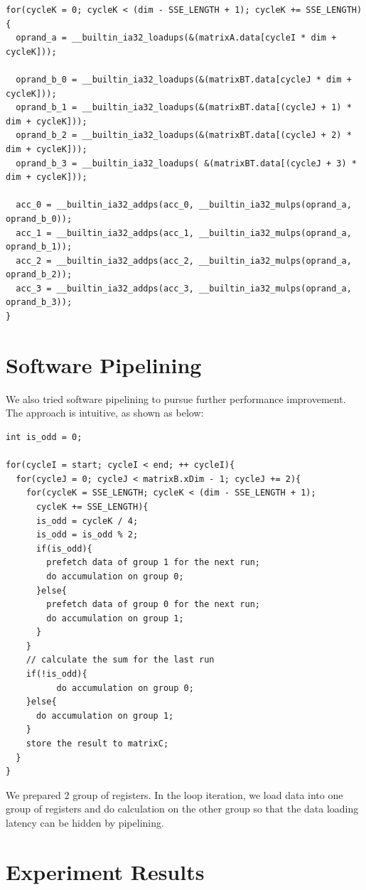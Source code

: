 \documentclass[12pt]{article}
\begin{document}
\footnotesize
\begin{verbatim}
for(cycleK = 0; cycleK < (dim - SSE_LENGTH + 1); cycleK += SSE_LENGTH){
  oprand_a = __builtin_ia32_loadups(&(matrixA.data[cycleI * dim + cycleK]));

  oprand_b_0 = __builtin_ia32_loadups(&(matrixBT.data[cycleJ * dim + cycleK]));
  oprand_b_1 = __builtin_ia32_loadups(&(matrixBT.data[(cycleJ + 1) * dim + cycleK]));
  oprand_b_2 = __builtin_ia32_loadups(&(matrixBT.data[(cycleJ + 2) * dim + cycleK]));
  oprand_b_3 = __builtin_ia32_loadups( &(matrixBT.data[(cycleJ + 3) * dim + cycleK]));
          
  acc_0 = __builtin_ia32_addps(acc_0, __builtin_ia32_mulps(oprand_a, oprand_b_0));
  acc_1 = __builtin_ia32_addps(acc_1, __builtin_ia32_mulps(oprand_a, oprand_b_1));
  acc_2 = __builtin_ia32_addps(acc_2, __builtin_ia32_mulps(oprand_a, oprand_b_2));
  acc_3 = __builtin_ia32_addps(acc_3, __builtin_ia32_mulps(oprand_a, oprand_b_3));
}
\end{verbatim}
\normalsize

\section{Software Pipelining}
We also tried software pipelining to pursue further performance improvement. 
The approach is intuitive, as shown as below:
\footnotesize
\begin{verbatim}
int is_odd = 0;

for(cycleI = start; cycleI < end; ++ cycleI){
  for(cycleJ = 0; cycleJ < matrixB.xDim - 1; cycleJ += 2){
    for(cycleK = SSE_LENGTH; cycleK < (dim - SSE_LENGTH + 1); 
      cycleK += SSE_LENGTH){
      is_odd = cycleK / 4;
      is_odd = is_odd % 2;
      if(is_odd){
        prefetch data of group 1 for the next run;
        do accumulation on group 0;
      }else{
        prefetch data of group 0 for the next run;
        do accumulation on group 1;
      }
    }   
    // calculate the sum for the last run
    if(!is_odd){
    	  do accumulation on group 0;
    }else{
      do accumulation on group 1;
    }
    store the result to matrixC;
  }
}
\end{verbatim}
\normalsize

We prepared 2 group of registers. In the loop iteration, we load data 
into one group of registers and do calculation on the other group so 
that the data loading latency can be hidden by pipelining.

\section{Experiment Results}
\end{document}
